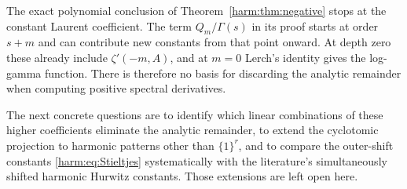 The exact polynomial conclusion of
Theorem~\ref{harm:thm:negative} stops at the constant Laurent
coefficient.  The term $Q_m/\Gamma(s)$ in its proof starts at
order $s+m$ and can contribute new constants from that point
onward.  At depth zero these already include $\zeta'(-m,A)$,
and at $m=0$ Lerch's identity gives the log-gamma function.
There is therefore no basis for discarding the analytic remainder
when computing positive spectral derivatives.

The next concrete questions are to identify which linear combinations
of these higher coefficients eliminate the analytic remainder, to
extend the cyclotomic projection to harmonic patterns other than
$\{1\}^r$, and to compare the outer-shift constants
\eqref{harm:eq:Stieltjes} systematically with the literature's
simultaneously shifted harmonic Hurwitz constants.  Those extensions
are left open here.
